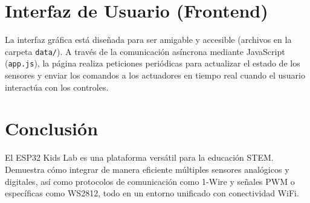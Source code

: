 \documentclass[12pt,a4paper]{article}
\begin{document}
\section{Interfaz de Usuario (Frontend)}
La interfaz gráfica está diseñada para ser amigable y accesible (archivos en la carpeta \texttt{data/}). 
A través de la comunicación asíncrona mediante JavaScript (\texttt{app.js}), la página realiza peticiones periódicas para actualizar el estado de los sensores y enviar los comandos a los actuadores en tiempo real cuando el usuario interactúa con los controles.

\section{Conclusión}
El ESP32 Kids Lab es una plataforma versátil para la educación STEM. Demuestra cómo integrar de manera eficiente múltiples sensores analógicos y digitales, así como protocolos de comunicación como 1-Wire y señales PWM o específicas como WS2812, todo en un entorno unificado con conectividad WiFi.
\end{document}
